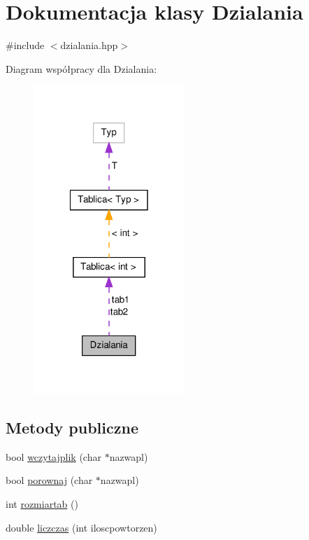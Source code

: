 \hypertarget{class_dzialania}{\section{\-Dokumentacja klasy \-Dzialania}
\label{class_dzialania}
}


{\ttfamily \#include $<$dzialania.\-hpp$>$}



\-Diagram współpracy dla \-Dzialania\-:\nopagebreak
\begin{figure}[H]
\begin{center}
\leavevmode
\includegraphics[width=162pt]{class_dzialania__coll__graph}
\end{center}
\end{figure}
\subsection*{\-Metody publiczne}
\begin{DoxyCompactItemize}
\item 
bool \hyperlink{class_dzialania_a4d1a1b41a0f2f76d4c16ad20f77b7cfa}{wczytajplik} (char $\ast$nazwapl)
\item 
bool \hyperlink{class_dzialania_af059b80e034854eb1ae878d6b636fff6}{porownaj} (char $\ast$nazwapl)
\item 
int \hyperlink{class_dzialania_a177e69d16b8280aae1d658adb67a8fbc}{rozmiartab} ()
\item 
double \hyperlink{class_dzialania_a8c13fb89281d74f9dd8dd22f43bffbb9}{liczczas} (int iloscpowtorzen)
\end{DoxyCompactItemize}
